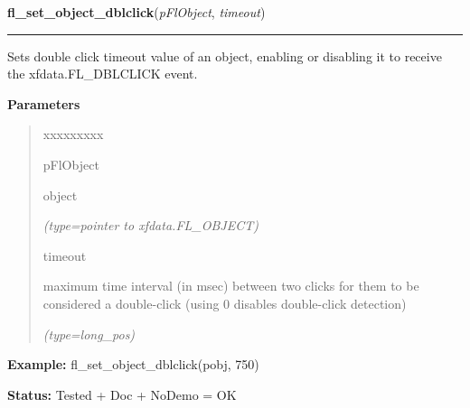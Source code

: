 \hspace{.8\funcindent}\begin{boxedminipage}{\funcwidth}

    \raggedright \textbf{fl\_set\_object\_dblclick}(\textit{pFlObject}, \textit{timeout})

    \vspace{-1.5ex}

    \rule{\textwidth}{0.5\fboxrule}
\setlength{\parskip}{2ex}
    Sets double click timeout value of an object, enabling or disabling it 
    to receive the xfdata.FL\_DBLCLICK event.

\setlength{\parskip}{1ex}
      \textbf{Parameters}
      \vspace{-1ex}

      \begin{quote}
        \begin{Ventry}{xxxxxxxxx}

          \item[pFlObject]

          object

            {\it (type=pointer to xfdata.FL\_OBJECT)}

          \item[timeout]

          maximum time interval (in msec) between two clicks for them to be
          considered a double-click (using 0 disables double-click 
          detection)

            {\it (type=long\_pos)}

        \end{Ventry}

      \end{quote}

\textbf{Example:} fl\_set\_object\_dblclick(pobj, 750)



\textbf{Status:} Tested + Doc + NoDemo = OK



    \end{boxedminipage}

    \label{xformslib:flbasic:fl_get_object_dblclick}

    \vspace{0.5ex}

